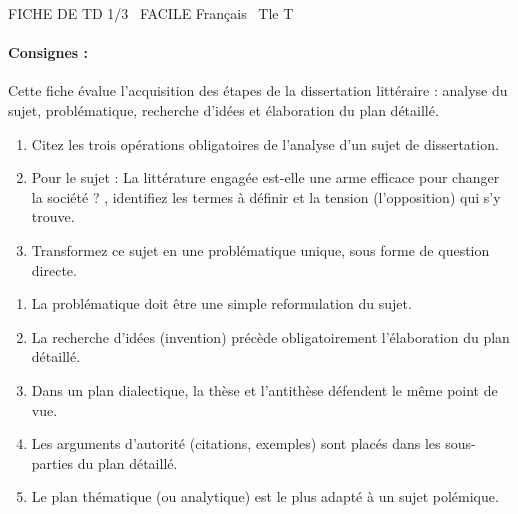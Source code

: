 \documentclass[11pt]{article}
\begin{document}
\begin{tcolorbox}[enhanced,colback=popink,colframe=popink,arc=10pt,boxrule=0pt,left=12pt,right=12pt,top=9pt,bottom=9pt]
{\color{white}\popxbold\small FICHE DE TD 1/3 \textbullet\ FACILE \hfill Français \textbullet\ Tle T\par}
\end{tcolorbox}
\vspace{4pt}
\paragraph{Consignes :} Cette fiche évalue l'acquisition des étapes de la dissertation littéraire : analyse du sujet, problématique, recherche d'idées et élaboration du plan détaillé.

\begin{exercice}
\begin{enumerate}
    \item Citez les trois opérations obligatoires de l'analyse d'un sujet de dissertation.
    \item Pour le sujet : \og La littérature engagée est-elle une arme efficace pour changer la société ? \fg{}, identifiez les termes à définir et la tension (l'opposition) qui s'y trouve.
    \item Transformez ce sujet en une problématique unique, sous forme de question directe.
\end{enumerate}
\end{exercice}

\begin{exercice}
\begin{enumerate}
    \item La problématique doit être une simple reformulation du sujet.
    \item La recherche d'idées (invention) précède obligatoirement l'élaboration du plan détaillé.
    \item Dans un plan dialectique, la thèse et l'antithèse défendent le même point de vue.
    \item Les arguments d'autorité (citations, exemples) sont placés dans les sous-parties du plan détaillé.
    \item Le plan thématique (ou analytique) est le plus adapté à un sujet polémique.
\end{enumerate}
\end{exercice}
\end{document}
